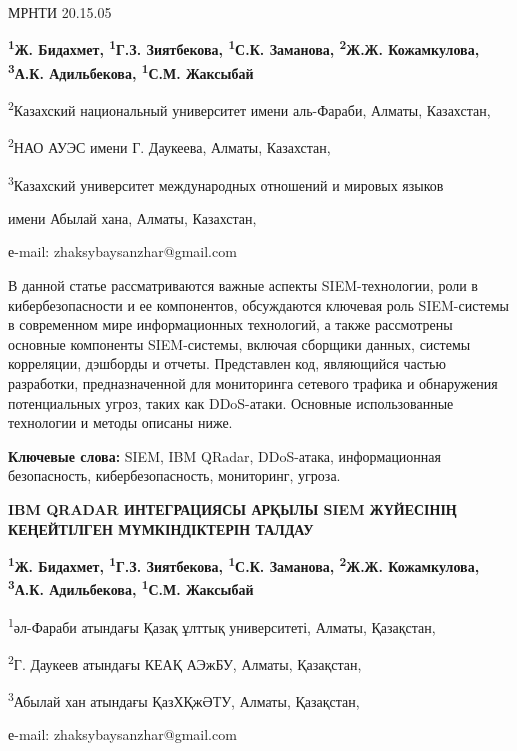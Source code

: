МРНТИ 20.15.05


\begin{center}
{\bfseries \textsuperscript{1}Ж. Бидахмет, \textsuperscript{1}Г.З.
Зиятбекова, \textsuperscript{1}С.К. Заманова, \textsuperscript{2}Ж.Ж.
Кожамкулова, \textsuperscript{3}А.К. Адильбекова, \textsuperscript{1}С.М.
Жаксыбай}

\textsuperscript{2}Казахский национальный университет имени аль-Фараби,
Алматы, Казахстан,

\textsuperscript{2}НАО АУЭС имени Г. Даукеева, Алматы, Казахстан,

\textsuperscript{3}Казахский университет международных отношений и
мировых языков

имени Абылай хана, Алматы, Казахстан,

е-mail: zhaksybaysanzhar@gmail.com
\end{center}

В данной статье рассматриваются важные аспекты SIEM-технологии, роли в
кибербезопасности и ее компонентов, обсуждаются ключевая роль
SIEM-системы в современном мире информационных технологий, а также
рассмотрены основные компоненты SIEM-системы, включая сборщики данных,
системы корреляции, дэшборды и отчеты. Представлен код, являющийся
частью разработки, предназначенной для мониторинга сетевого трафика и
обнаружения потенциальных угроз, таких как DDoS-атаки. Основные
использованные технологии и методы описаны ниже.

{\bfseries Ключевые слова:} SIEM, IBM QRadar, DDoS-атака, информационная
безопасность, кибербезопасность, мониторинг, угроза.

\begin{center}
{\large\bfseries IBM QRADAR ИНТЕГРАЦИЯСЫ АРҚЫЛЫ SIEM ЖҮЙЕСІНІҢ КЕҢЕЙТІЛГЕН
МҮМКІНДІКТЕРІН ТАЛДАУ}

{\bfseries \textsuperscript{1}Ж. Бидахмет, \textsuperscript{1}Г.З.
Зиятбекова, \textsuperscript{1}С.К. Заманова, \textsuperscript{2}Ж.Ж.
Кожамкулова, \textsuperscript{3}А.К. Адильбекова, \textsuperscript{1}С.М.
Жаксыбай}

\textsuperscript{1}әл-Фараби атындағы Қазақ ұлттық университеті, Алматы,
Қазақстан,

\textsuperscript{2}Г. Даукеев атындағы КЕАҚ АЭжБУ, Алматы, Қазақстан,

\textsuperscript{3}Абылай хан атындағы ҚазХҚжӘТУ, Алматы, Қазақстан,

е-mail: zhaksybaysanzhar@gmail.com
\end{center}

